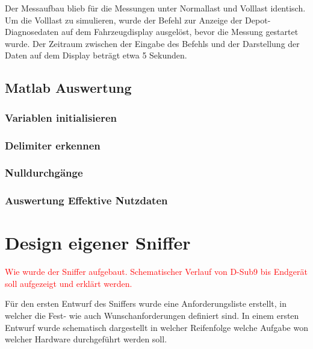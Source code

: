 Der Messaufbau blieb für die Messungen unter Normallast und Volllast identisch. Um die Volllast zu simulieren, wurde der Befehl zur Anzeige der Depot-Diagnosedaten auf dem Fahrzeugdisplay ausgelöst, bevor die Messung gestartet wurde. Der Zeitraum zwischen der Eingabe des Befehls und der Darstellung der Daten auf dem Display beträgt etwa 5 Sekunden.

\subsection{Matlab Auswertung}

\subsubsection{Variablen initialisieren}

\subsubsection{Delimiter erkennen}

\subsubsection{Nulldurchgänge}

\subsubsection{Auswertung Effektive Nutzdaten}








\section{Design eigener Sniffer}
\textcolor{red}{Wie wurde der Sniffer aufgebaut. Schematischer Verlauf von D-Sub9 bis Endgerät soll aufgezeigt und erklärt werden.}

Für den ersten Entwurf des Sniffers wurde eine Anforderungsliste erstellt, in welcher die Fest- wie auch Wunschanforderungen definiert sind. In einem ersten Entwurf wurde schematisch dargestellt in welcher Reifenfolge welche Aufgabe won welcher Hardware durchgeführt werden soll. 

